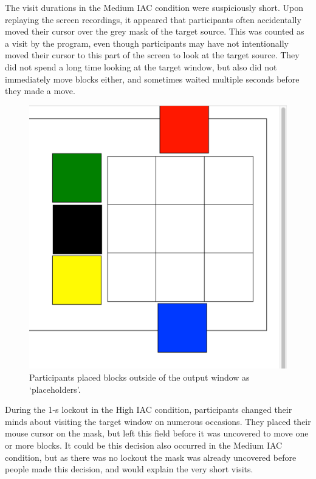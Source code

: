 The visit durations in the Medium IAC condition were suspiciously short. Upon replaying the screen recordings, it appeared that participants often accidentally moved their cursor over the grey mask of the target source. This was counted as a visit by the program, even though participants may have not intentionally moved their cursor to this part of the screen to look at the target source. They did not spend a long time looking at the target window, but also did not immediately move blocks either, and sometimes waited multiple seconds before they made a move. 

\begin{figure}[!ht]
\centering
\includegraphics[scale=0.3]{images/ch34/ch4_placeholders.pdf}
\caption[Study 3 placeholders]{Participants placed blocks outside of the output window as `placeholders'.}
\vspace{-9pt}
\label{fig:ch4_placeholders}
\end{figure}

During the 1-s lockout in the High IAC condition, participants changed their minds about visiting the target window on numerous occasions. They placed their mouse cursor on the mask, but left this field before it was uncovered to move one or more blocks. It could be this decision also occurred in the Medium IAC condition, but as there was no lockout the mask was already uncovered before people made this decision, and would explain the very short visits.

